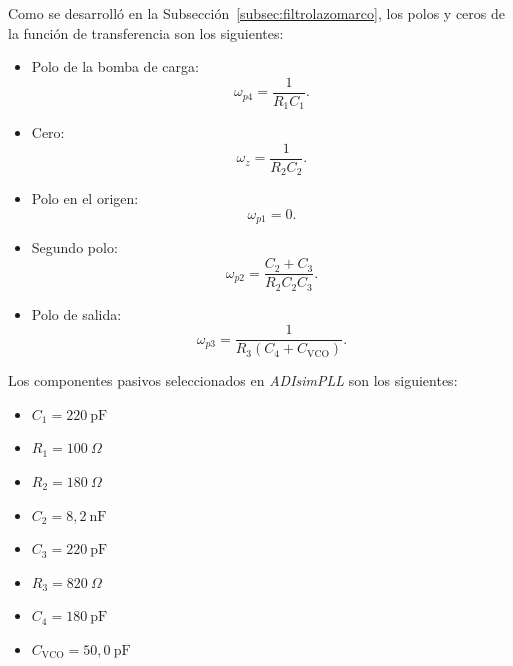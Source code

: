 Como se desarrolló en la Subsección~\ref{subsec:filtrolazomarco}, los polos y ceros de la función de transferencia son los siguientes:

\begin{itemize}
\item Polo de la bomba de carga:
\begin{equation}
\omega_{p4} = \frac{1}{R_1 C_1}.
\end{equation}

\item Cero:
\begin{equation}
\omega_z = \frac{1}{R_2 C_2}.
\end{equation}

\item Polo en el origen:
\begin{equation}
\omega_{p1} = 0.
\end{equation}

\item Segundo polo:
\begin{equation}
\omega_{p2} = \frac{C_2 + C_3}{R_2 C_2 C_3}.
\end{equation}

\item Polo de salida:
\begin{equation}
\omega_{p3} = \frac{1}{R_3 (C_4 + C_{\mathrm{VCO}})}.
\end{equation}
\end{itemize}

Los componentes pasivos seleccionados en \textit{ADIsimPLL} son los siguientes:
\begin{itemize}
  \item $C_1 = 220~\mathrm{pF}$
  \item $R_1 = 100~\Omega$
  \item $R_2 = 180~\Omega$
  \item $C_2 = 8{,}2~\mathrm{nF}$
  \item $C_3 = 220~\mathrm{pF}$
  \item $R_3 = 820~\Omega$
  \item $C_4 = 180~\mathrm{pF}$
  \item $C_{\mathrm{VCO}} = 50{,}0~\mathrm{pF}$
\end{itemize}

